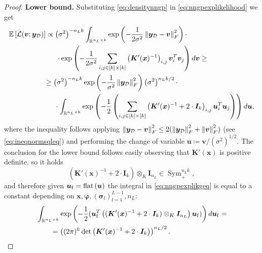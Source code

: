 \begin{proof}
	\textbf{Lower bound.} Substituting \cref{eq:densitynngp} in \cref{eq:nngpexplikelihood} we get
	\begin{align} 
		& \begin{aligned} \label{eq:nngpexplikprop}
			\mathbb{E}_{\kern-0.5pt}\left[\mathcal{L}(\bm{v}; \bm{y}_{\mathcal{D}})\right] & \propto \left(\sigma^2\right)^{- n_L k} \int_{\mathbb{R}^{n_L \times k}} \operatorname{exp}\left(-\frac{1}{2\sigma^2} \left\lVert\bm{y}_{\mathcal{D}} - \bm{v}\right\rVert_F^2\right) \cdot \\
			& \kern14.65pt \cdot \operatorname{exp}\left(-\frac{1}{2\sigma^2} \sum_{i, j \in [k] \times [k]} \left(\bm{K}'(\bm{x})^{-1}\right)_{i, j} \bm{v}_i^T \bm{v}_j\right) d\bm{v} \geq 
		\end{aligned} \\
		& \kern49.75pt \begin{aligned} \label{eq:nngpexplikgeq}
			& \geq \left(\sigma^2\right)^{- n_L k} \operatorname{exp}\left(-\frac{1}{\sigma^2} \left\lVert\bm{y}_{\mathcal{D}}\right\rVert_F^2\right) \left(\sigma^2\right)^{n_L k /2} \cdot \\
			& \kern14.65pt \cdot \int_{\mathbb{R}^{n_L \times k}} \operatorname{exp}\left(-\frac{1}{2} \left(\sum_{i, j \in [k] \times [k]} \left(\bm{K}'(\bm{x})^{-1} + 2 \cdot \bm{I}_k\right)_{i, j} \bm{u}_i^T \bm{u}_j\right)\right) d\bm{u},
		\end{aligned}
	\end{align}
	where the inequality follows applying $\left\lVert\bm{y}_{\mathcal{D}} - \bm{v}\right\rVert_F^2 \leq 2(\left\lVert\bm{y}_{\mathcal{D}}\right\rVert_F^2 + \left\lVert\bm{v}\right\rVert_F^2)$ (see \cref{eq:ineqnormsqleq}) and performing the change of variable $\bm{u} \coloneqq \bm{v} / (\sigma^2)^{1/2}$. 
	The conclusion for the lower bound follows easily observing that $\bm{K}'(\bm{x})$ is positive definite, so it holds 
	\begin{equation*}
		(\bm{K}'(\bm{x})^{-1} + 2 \cdot \bm{I}_k) \otimes_K \bm{I}_{n_L} \in \operatorname{Sym}_+^{n_L k}, 
	\end{equation*}
	and therefore given $\bm{u}_{\mathrm{f}} = \operatorname{flat}\left(\bm{u}\right)$ the integral in \cref{eq:nngpexplikgeq} is equal to a constant depending on $\bm{x}, \bm{\varphi}, \left(\bm{\sigma}_l\right)_{l = 1}^{L - 1}, n_L$: 
	\begin{equation} \label{eq:boundinfthetaprime}
		\begin{aligned}
			& \int_{\mathbb{R}^{n_L \times k}} \operatorname{exp}\left(-\frac{1}{2} (\bm{u}_{\mathrm{f}}^T \left((\bm{K}'(\bm{x})^{-1} + 2 \cdot \bm{I}_k) \otimes_K \bm{I}_{n_L}\right) \bm{u}_{\mathrm{f}})\right) d\bm{u}_{\mathrm{f}} = \\
			& \kern20pt = \left((2\pi)^{k} \operatorname{det}\left(\bm{K}'(\bm{x})^{-1} + 2 \cdot \bm{I}_k\right)\right)^{n_L / 2}.
		\end{aligned}
	\end{equation}   
	

\end{proof}
